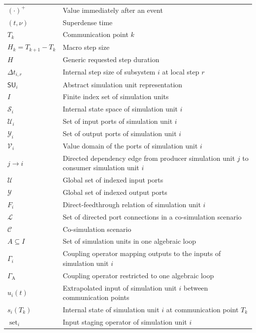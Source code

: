 \begin{table}[htbp]
\begin{tabular}{ll}
        $(\cdot)^+$ & Value immediately after an event \\
        $(t,\nu)$ & Superdense time \\
        $T_k$ & Communication point $k$ \\
        $H_k = T_{k+1} - T_k$ & Macro step size \\
        $H$ & Generic requested step duration \\
        $\Delta t_{i,r}$ & Internal step size of subsystem $i$ at local step $r$ \\
        $\mathsf{SU}_i$ & Abstract simulation unit representation \\
        $I$ & Finite index set of simulation units \\
        $\mathcal{S}_i$ & Internal state space of simulation unit $i$ \\
        $\mathcal{U}_i$ & Set of input ports of simulation unit $i$ \\
        $\mathcal{Y}_i$ & Set of output ports of simulation unit $i$ \\
        $\mathcal{V}_i$ & Value domain of the ports of simulation unit $i$ \\
        $j \rightarrow i$ & Directed dependency edge from producer simulation unit $j$ to consumer simulation unit $i$ \\
        $\mathcal{U}$ & Global set of indexed input ports \\
        $\mathcal{Y}$ & Global set of indexed output ports \\
        $F_i$ & Direct-feedthrough relation of simulation unit $i$ \\
        $\mathcal{L}$ & Set of directed port connections in a co-simulation scenario \\
        $\mathcal{C}$ & Co-simulation scenario \\
        $A \subseteq I$ & Set of simulation units in one algebraic loop \\
        $\Gamma_i$ & Coupling operator mapping outputs to the inputs of simulation unit $i$ \\
        $\Gamma_\mathrm{A}$ & Coupling operator restricted to one algebraic loop \\
        $\hat{u}_i(t)$ & Extrapolated input of simulation unit $i$ between communication points \\
        $s_i(T_k)$ & Internal state of simulation unit $i$ at communication point $T_k$ \\
        $\operatorname{set}_i$ & Input staging operator of simulation unit $i$ \\

\end{tabular}
\end{table}
